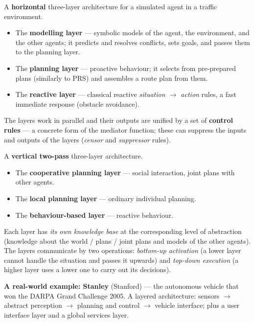 \documentclass[11pt,a4paper]{article}
\theoremstyle{definition}
\begin{document}
\begin{defbox}
A \textbf{horizontal} three-layer architecture for a simulated agent in a traffic environment.
\begin{itemize}
\item The \textbf{modelling layer} --- symbolic models of the agent, the environment, and the other
  agents; it predicts and resolves conflicts, sets goals, and passes them to the planning layer.
\item The \textbf{planning layer} --- proactive behaviour; it selects from pre-prepared plans
  (similarly to PRS) and assembles a route plan from them.
\item The \textbf{reactive layer} --- classical reactive \emph{situation $\to$ action} rules, a fast
  immediate response (obstacle avoidance).
\end{itemize}
The layers work in parallel and their outputs are unified by a set of \textbf{control rules} --- a
concrete form of the mediator function; these can suppress the inputs and outputs of the layers
(\emph{censor} and \emph{suppressor} rules).
\end{defbox}

\begin{defbox}
A \textbf{vertical two-pass} three-layer architecture.
\begin{itemize}
\item The \textbf{cooperative planning layer} --- social interaction, joint plans with other agents.
\item The \textbf{local planning layer} --- ordinary individual planning.
\item The \textbf{behaviour-based layer} --- reactive behaviour.
\end{itemize}
Each layer has \emph{its own knowledge base} at the corresponding level of abstraction (knowledge
about the world / plans / joint plans and models of the other agents). The layers communicate by two
operations: \emph{bottom-up activation} (a lower layer cannot handle the situation and passes it
upwards) and \emph{top-down execution} (a higher layer uses a lower one to carry out its decisions).
\end{defbox}

\medskip
\noindent\textbf{A real-world example: Stanley} (Stanford) --- the autonomous vehicle that won
the DARPA Grand Challenge 2005. A layered architecture: sensors $\to$ abstract perception $\to$
planning and control $\to$ vehicle interface; plus a user interface layer and a global services
layer.
\end{document}
